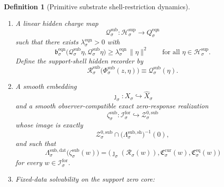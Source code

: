 \documentclass[11pt]{article}
\newcommand{\ForSpace}[1]{\mathcal I_{#1}^{\mathrm{for}}}
\newcommand{\Reduction}[1]{\mathcal R_{#1}}
\newcommand{\CurrentCarrier}[1]{\mathfrak C_{#1}^{\mathrm{cur}}}
\newcommand{\EqCarrier}[1]{\mathfrak C_{#1}^{\mathrm{eq}}}
\newcommand{\VisibleAffine}[1]{\widehat X_{#1}}
\newcommand{\DataSpace}[1]{\mathcal Y_{#1}^{\mathrm{obs}}}
\newcommand{\AmbientTarget}[1]{E_{#1}^{\mathrm{amb}}}
\newcommand{\EqnSpace}[1]{\mathcal U_{#1}^{\mathrm{eqn}}}
\newcommand{\EqnBody}[1]{\mathcal B_{#1}^{\mathrm{eqn}}}
\newcommand{\EqnData}[1]{\Lambda_{#1}^{\mathrm{eqn,dat}}}
\newcommand{\EqnShell}[1]{\Lambda_{#1}^{\mathrm{eqn,sh}}}
\newcommand{\EqnTarget}[1]{Q_{#1}^{\mathrm{eqn}}}
\newcommand{\EqnPair}[1]{\mathfrak b_{#1}^{\mathrm{eqn}}}
\newcommand{\EqnZero}[1]{V_{#1}^{\mathrm{eqn},0}}
\newcommand{\EqnHidden}[1]{H_{#1}^{\mathrm{eqn}}}
\newcommand{\SeedHidden}[1]{\mathcal H_{#1}^{\mathrm{sup}}}
\newcommand{\ShellChart}[1]{\Psi_{#1}^{\mathrm{sup}}}
\newcommand{\SubData}[1]{\Lambda_{#1}^{\mathrm{sub,dat}}}
\newcommand{\SubShellMap}[1]{\Lambda_{#1}^{\mathrm{sub,sh}}}
\newcommand{\SubSupportShell}[1]{\mathcal Z_{#1}^{\mathrm{sub,sup}}}
\newcommand{\SubZeroCore}[1]{\mathcal Z_{#1}^{0,\mathrm{sub}}}
\newcommand{\SubSplit}[1]{\Phi_{#1}^{\mathrm{sub}}}
\newcommand{\SubCharge}[1]{\mathcal Q_{#1}^{\mathrm{sub}}}
\newcommand{\SubResidual}[1]{\mathcal R_{#1}^{\mathrm{sub}}}
\newcommand{\SubEmbed}[1]{\zeta_{#1}^{\mathrm{sub}}}
\newtheorem{definition}{Definition}
\begin{document}
\begin{definition}[Primitive substrate shell-restriction dynamics]
\begin{enumerate}
\begin{equation}
    \end{equation}
    The shell readouts become affine in the support-shell chart: there exist affine maps
    \[
    \EqnData{\sigma}:\EqnSpace{\sigma}\to\DataSpace{\sigma},
    \qquad
    \EqnShell{\sigma}:\EqnSpace{\sigma}\to\AmbientTarget{\sigma},
    \]
    such that
    \begin{equation}
    \EqnData{\sigma}\circ\ShellChart{\sigma}
    =
    \SubData{\sigma}\big|_{\SubSupportShell{\sigma}},
    \qquad
    \EqnShell{\sigma}\circ\ShellChart{\sigma}
    =
    \SubShellMap{\sigma}\big|_{\SubSupportShell{\sigma}}.
    \label{eq:eqnchartreadouts}
    \end{equation}
    The transported symmetry and time-reversal actions act linearly on \(\EqnSpace{\sigma}\), preserving \(\EqnZero{\sigma}\), \(\EqnHidden{\sigma}\), and \(\EqnBody{\sigma}\).
    \item A linear hidden charge map
    \[
    \SubCharge{\sigma}:\SeedHidden{\sigma}\to\EqnTarget{\sigma}
    \]
    such that there exists \(\lambda_{\sigma}^{\mathrm{eqn}}>0\) with
    \begin{equation}
    \EqnPair{\sigma}\bigl(\SubCharge{\sigma}\eta,\SubCharge{\sigma}\eta\bigr)
    \ge
    \lambda_{\sigma}^{\mathrm{eqn}}\,
    \|\eta\|^{2}
    \qquad
    \text{for all }\eta\in\SeedHidden{\sigma}.
    \label{eq:subchargegap}
    \end{equation}
    Define the support-shell hidden recorder by
    \begin{equation}
    \SubResidual{\sigma}\bigl(\SubSplit{\sigma}(z,\eta)\bigr)
    \equiv
    \SubCharge{\sigma}(\eta).
    \label{eq:subresidual}
    \end{equation}
    \item A smooth embedding
    \[
    \jmath_{\sigma}:X_{\sigma}\hookrightarrow\VisibleAffine{\sigma}
    \]
    and a smooth observer-compatible exact zero-response realization
    \[
    \SubEmbed{\sigma}:\ForSpace{\sigma}\hookrightarrow\SubZeroCore{\sigma}
    \]
    whose image is exactly
    \[
    \SubZeroCore{\sigma}
    \cap
    \bigl(\SubShellMap{\sigma}\bigr)^{-1}(0),
    \]
    and such that
    \begin{equation}
    \SubData{\sigma}\bigl(\SubEmbed{\sigma}(w)\bigr)
    =
    \bigl(
    \jmath_{\sigma}(\Reduction{\sigma}(w)),
    \CurrentCarrier{\sigma}(w),
    \EqCarrier{\sigma}(w)
    \bigr)
    \label{eq:subcompat}
    \end{equation}
    for every \(w\in\ForSpace{\sigma}\).
    \item Fixed-data solvability on the support zero core:

\end{enumerate}
\end{definition}
\end{document}
